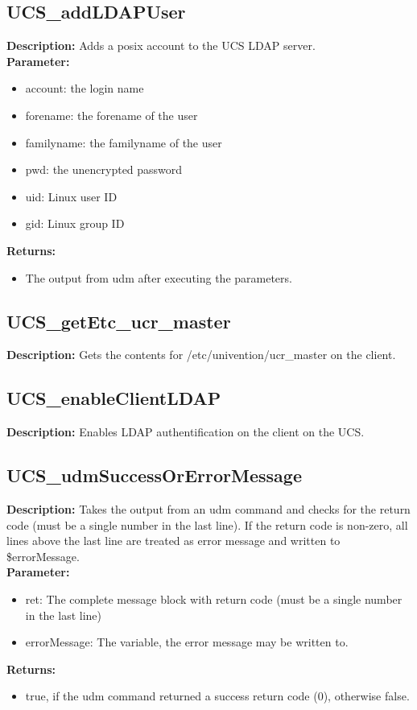 \subsection{UCS\_addLDAPUser}
\textbf{Description:} Adds a posix account to the UCS LDAP server.\\
\textbf{Parameter:}
\begin{itemize}
\item account: the login name
\item forename: the forename of the user
\item familyname: the familyname of the user
\item pwd: the unencrypted password
\item uid: Linux user ID
\item gid: Linux group ID
\end{itemize}
\textbf{Returns:}
\begin{itemize}
\item The output from udm after executing the parameters.
\end{itemize}

\subsection{UCS\_getEtc\_ucr\_master}
\textbf{Description:} Gets the contents for /etc/univention/ucr\_master on the client.\\

\subsection{UCS\_enableClientLDAP}
\textbf{Description:} Enables LDAP authentification on the client on the UCS.\\

\subsection{UCS\_udmSuccessOrErrorMessage}
\textbf{Description:} Takes the output from an udm command and checks for the return code (must be a single number in the last line). If the return code is non-zero, all lines above the last line are treated as error message and written to \$errorMessage.\\
\textbf{Parameter:}
\begin{itemize}
\item ret: The complete message block with return code (must be a single number in the last line)
\item errorMessage: The variable, the error message may be written to.
\end{itemize}
\textbf{Returns:}
\begin{itemize}
\item true, if the udm command returned a success return code (0), otherwise false.
\end{itemize}


